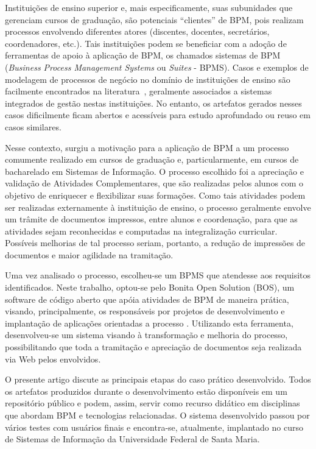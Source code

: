 \documentclass[12pt]{article}
\begin{document}
Instituições de ensino superior e, mais especificamente, suas subunidades que gerenciam cursos de graduação, são potenciais “clientes” de BPM, pois realizam processos envolvendo diferentes atores (discentes, docentes, secretários, coordenadores, etc.). Tais instituições podem se beneficiar com a adoção de ferramentas de apoio à aplicação de BPM, os chamados sistemas de BPM (\emph{Business Process Management Systems} ou \emph{Suites} - BPMS). Casos e exemplos de modelagem de processos de negócio no domínio de instituições de ensino são facilmente encontrados na literatura~\cite{JestonNelis2012}, geralmente associados a sistemas integrados de gestão nestas instituições. No entanto, os artefatos gerados nesses casos dificilmente ficam abertos e acessíveis para estudo aprofundado ou reuso em casos similares.

Nesse contexto, surgiu a motivação para a aplicação de BPM a um processo comumente realizado em cursos de graduação e, particularmente, em cursos de bacharelado em Sistemas de Informação.
O processo escolhido foi a apreciação e validação de Atividades Complementares, que são realizadas pelos alunos com o objetivo de enriquecer e flexibilizar suas formações. Como tais atividades podem ser realizadas externamente à instituição de ensino, o processo geralmente envolve um trâmite de documentos impressos, entre alunos e coordenação, para que as atividades sejam reconhecidas e computadas na integralização curricular. Possíveis melhorias de tal processo seriam, portanto, a redução de impressões de documentos e maior agilidade na tramitação.

Uma vez analisado o processo, escolheu-se um BPMS que atendesse aos requisitos identificados. Neste trabalho, optou-se pelo Bonita Open Solution (BOS), um software de código aberto que apóia atividades de BPM de maneira  prática, visando, principalmente, os responsáveis  por projetos de desenvolvimento e implantação de aplicações orientadas a processo \cite{BONITASOFT}. Utilizando esta ferramenta, desenvolveu-se um sistema visando à transformação e melhoria do processo, possibilitando que toda a tramitação e apreciação de documentos seja realizada via Web pelos envolvidos.

O presente artigo discute as principais etapas do caso prático desenvolvido. Todos os artefatos produzidos durante o desenvolvimento estão disponíveis em um repositório público e podem, assim, servir como recurso didático em disciplinas que abordam BPM e tecnologias relacionadas. O sistema desenvolvido passou por vários testes com usuários finais e encontra-se, atualmente, implantado no curso de Sistemas de Informação da Universidade Federal de Santa Maria.
\end{document}

